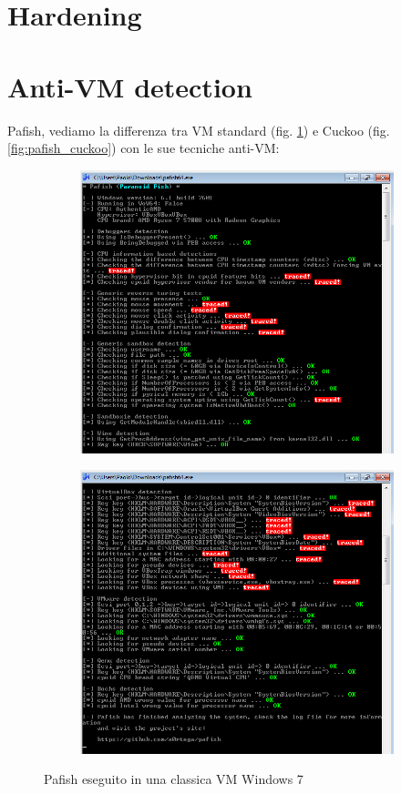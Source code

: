 \section{Hardening}

\section{Anti-VM detection}
Pafish, vediamo la differenza tra VM standard (fig. \ref{fig:pafish_standard_vm}) e Cuckoo (fig. \ref{fig:pafish_cuckoo}) con le sue tecniche anti-VM:

\begin{figure}[H]
\centering
\begin{subfigure}{.5\textwidth}
  \centering
  \includegraphics[width=.9\linewidth]{assets/pafish_standard_vm_1.png}
\end{subfigure}%
\begin{subfigure}{.5\textwidth}
  \centering
  \includegraphics[width=.9\linewidth]{assets/pafish_standard_vm_2.png}
\end{subfigure}
\caption{Pafish eseguito in una classica VM Windows 7}
\label{fig:pafish_standard_vm}
\end{figure}

